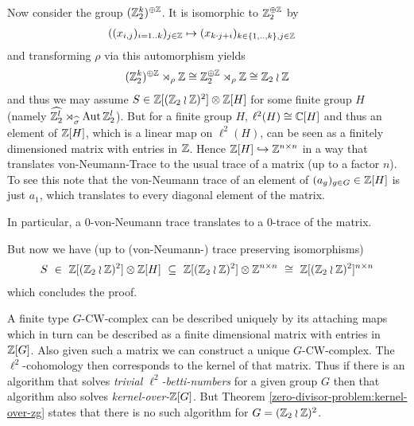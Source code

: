 	Now consider the group $(\mathbb{Z}_2^k)^{\oplus\mathbb{Z}}$. It is isomorphic to $\mathbb{Z}_2^{\oplus \mathbb{Z}}$ by
	\begin{align*}
		& ((x_{i,j})_{i = 1 .. k})_{j \in \mathbb{Z}} \mapsto (x_{k \cdot j + i})_{k \in \{1,..,k\}, j \in \mathbb{Z}}
	\end{align*}
	and transforming $\rho$ via this automorphism yields
	\begin{align*}
		(\mathbb{Z}_2^k)^{\oplus\mathbb{Z}} \rtimes_\rho \mathbb{Z} \cong \mathbb{Z}_2^{\oplus\mathbb{Z}} \rtimes_{\rho} \mathbb{Z} \cong \mathbb{Z}_2 \wr \mathbb{Z}
	\end{align*}
	and thus we may assume $S \in \mathbb{Z}[(\mathbb{Z}_2 \wr \mathbb{Z})^2] \otimes \mathbb{Z}[H]$ for some finite group $H$ (namely $\widehat{\mathbb{Z}_2^l} \rtimes_{\widehat\sigma} \operatorname{Aut} \mathbb{Z}_2^l$).
	But for a finite group $H$, $\ell^2(H) \cong \mathbb{C}[H]$ and thus an element of $\mathbb{Z}[H]$, which is a linear map on $\ell^2(H)$, can be seen as a finitely dimensioned matrix with entries in $\mathbb{Z}$.
	Hence $\mathbb{Z}[H] \hookrightarrow \mathbb{Z}^{n \times n}$ in a way that translates von-Neumann-Trace to the usual trace of a matrix (up to a factor $n$).
	To see this note that the von-Neumann trace of an element of $(a_g)_{g \in G} \in \mathbb{Z}[H]$ is just $a_1$, which translates to every diagonal element of the matrix.

	In particular, a $0$-von-Neumann trace translates to a $0$-trace of the matrix.

	But now we have (up to (von-Neumann-) trace preserving isomorphisms)
	\begin{align*}
		S ~\in~ \mathbb{Z}[(\mathbb{Z}_2 \wr \mathbb{Z})^2] \otimes \mathbb{Z}[H] ~\subseteq~ \mathbb{Z}[(\mathbb{Z}_2 \wr \mathbb{Z})^2] \otimes \mathbb{Z}^{n \times n} ~\cong~ \mathbb{Z}[(\mathbb{Z}_2 \wr \mathbb{Z})^2]^{n \times n}
	\end{align*}
	which concludes the proof.
\endproof

	A finite type $G$-CW-complex can be described uniquely by its attaching maps which in turn can be described as a finite dimensional matrix with entries in $\mathbb{Z}[G]$. Also given such a matrix we can construct a unique $G$-CW-complex. The $\ell^2$-cohomology then corresponds to the kernel of that matrix.
	Thus if there is an algorithm that solves \emph{trivial $\ell^2$-betti-numbers} for a given group $G$ then that algorithm also solves \emph{kernel-over-$\mathbb{Z}[G]$}. But Theorem \ref{zero-divisor-problem:kernel-over-zg} states that there is no such algorithm for $G = (\mathbb{Z}_2 \wr \mathbb{Z})^2$.
\endproof

